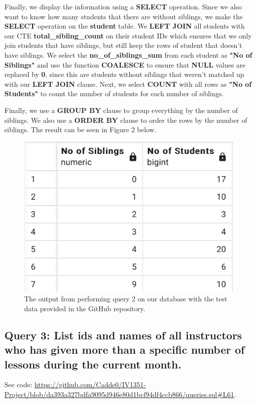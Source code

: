 \documentclass[a4paper]{scrartcl}
\begin{document}
Finally, we display the information using a \textbf{SELECT} operation. Since we also want to know how many students that there are without siblings, we make the \textbf{SELECT} operation on the \textbf{student} table. We \textbf{LEFT JOIN} all students with our CTE \textbf{total\_sibling\_count} on their student IDs which ensures that we only join students that have siblings, but still keep the rows of student that doesn't have siblings. We select the \textbf{no\_of\_siblings\_sum} from each student as \textbf{"No of Siblings"} and use the function \textbf{COALESCE} to ensure that \textbf{NULL} values are replaced by \textbf{0}, since this are students without siblings that weren't matched up with our \textbf{LEFT JOIN} clause. Next, we select \textbf{COUNT} with all rows as \textbf{"No of Students"} to count the number of students for each number of siblings.

Finally, we use a \textbf{GROUP BY} clause to group everything by the number of siblings. We also use a \textbf{ORDER BY} clause to order the rows by the number of siblings. The result can be seen in Figure 2 below.

\begin{figure}[H]
    \begin{center}
      \includegraphics[scale=0.6]{query2_output.png}
      \caption{The output from performing query 2 on our database with the test data provided in the GitHub repository.}
      \label{fig:diag}
    \end{center}
  \end{figure}


\subsection{Query 3: List ids and names of all instructors who has given more than a specific number of lessons during the current month.}
See code: \url{https://github.com/Cadde0/IV1351-Project/blob/da393a327bdfa9095d946e80d1bcf94df4ccb866/queries.sql#L61}.
\end{document}
